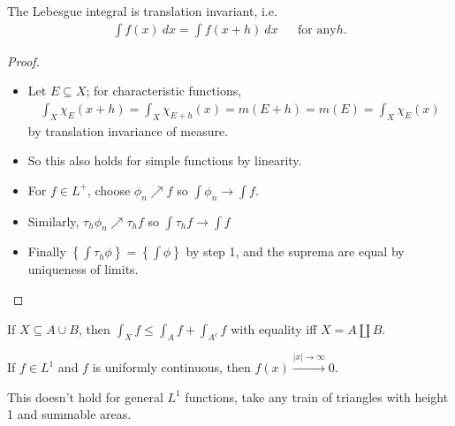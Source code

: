 \begin{proposition}

The Lebesgue integral is translation invariant, i.e.
\begin{align*}
\int f(x) ~dx = \int f(x + h) ~dx &&\text{for any} h
.\end{align*}

\end{proposition}

\begin{proof}

\envlist

\begin{itemize}
\tightlist
\item
  Let \(E\subseteq X\); for characteristic functions,
  \begin{align*}
  \int_X \chi_E(x+h) 
  = \int_{X} \chi_{E+h}(x) = m(E+h) = m(E) = \int_X \chi_E(x)
  \end{align*}
  by translation invariance of measure.
\item
  So this also holds for simple functions by linearity.
\item
  For \(f\in L^+\), choose \(\phi_n \nearrow f\) so
  \(\int \phi_n \to \int f\).
\item
  Similarly, \(\tau_h \phi_n \nearrow \tau_h f\) so
  \(\int \tau_h f \to \int f\)
\item
  Finally
  \(\left\{{\int \tau_h \phi}\right\} = \left\{{\int \phi}\right\}\) by
  step 1, and the suprema are equal by uniqueness of limits.
\end{itemize}

\end{proof}

\begin{proposition}

If \(X \subseteq A \cup B\), then
\(\int_X f \leq \int_A f + \int_{A^c} f\) with equality iff
\(X = A{\textstyle\coprod}B\).

\end{proposition}

\begin{proposition}

If \(f \in L^1\) and \(f\) is uniformly continuous, then
\(f(x) \overset{{\left\lvert {x} \right\rvert}\to\infty}\to 0\).

\end{proposition}

\begin{warnings}

This doesn't hold for general \(L^1\) functions, take any train of
triangles with height 1 and summable areas.

\end{warnings}

